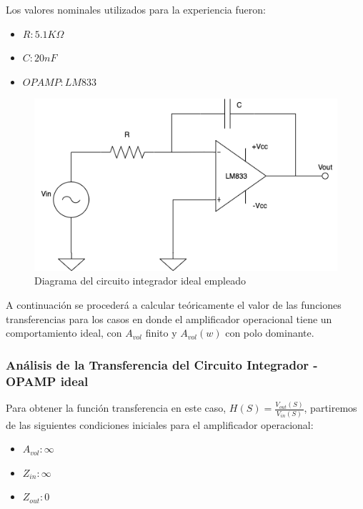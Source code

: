 Los valores nominales utilizados para la experiencia fueron:

\begin{itemize}
	\item $R: 5.1K \Omega$ 
	\item $C: 20nF$
	\item $OPAMP: LM833$
\end{itemize}

\begin{figure}[H]
    \centering 
    \includegraphics [scale=0.5] {../Ejercicio3-CircuitoIntegradoresyDerivadores/Imagenes/diagrama-integrador.png} 
    \caption{Diagrama del circuito integrador ideal empleado}
    \label{fig:emptyPlotTool}
\end{figure}

A continuación se procederá a calcular teóricamente el valor de las funciones transferencias para los casos en 
donde el amplificador operacional tiene un comportamiento ideal, con $A_{vol}$ finito y $A_{vol}(w)$ con polo dominante.

\subsubsection{Análisis de la Transferencia del Circuito Integrador - OPAMP ideal}

Para obtener la función transferencia en este caso, $H(S) = \frac{V_{out} (S)}{V_{in} (S)}$, partiremos de las siguientes condiciones
iniciales para el amplificador operacional:

\begin{itemize}
	\item $A_{vol}: \infty$
	\item $Z_{in}: \infty$
	\item $Z_{out}: 0$
\end{itemize}

